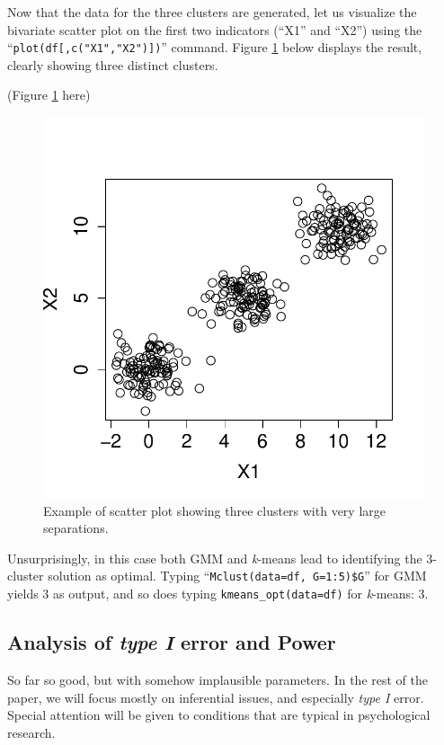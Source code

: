 \documentclass[
  man,floatsintext]{apa6}
\begin{document}
Now that the data for the three clusters are generated, let us visualize the bivariate scatter plot on the first two indicators (``X1'' and ``X2'') using the ``\texttt{plot(df{[},c("X1","X2"){]})}'' command. Figure \ref{fig:figure-three-cluster-example} below displays the result, clearly showing three distinct clusters.

(Figure \ref{fig:figure-three-cluster-example} here)

\begin{figure}

{\centering \includegraphics[width=0.5\linewidth]{paper_files/figure-latex/figure-three-cluster-example-1} 

}

\caption{Example of scatter plot showing three clusters with very large separations.}\label{fig:figure-three-cluster-example}
\end{figure}

Unsurprisingly, in this case both GMM and \emph{k}-means lead to identifying the 3-cluster solution as optimal. Typing ``\texttt{Mclust(data=df,\ G=1:5)\$G}'' for GMM yields 3 as output, and so does typing \texttt{kmeans\_opt(data=df)} for \emph{k}-means: 3.

\hypertarget{analysis-of-type-i-error-and-power}{%
\subsection{\texorpdfstring{Analysis of \emph{type I} error and Power}{Analysis of type I error and Power}}\label{analysis-of-type-i-error-and-power}}

So far so good, but with somehow implausible parameters. In the rest of the paper, we will focus mostly on inferential issues, and especially \emph{type I} error. Special attention will be given to conditions that are typical in psychological research.
\end{document}
